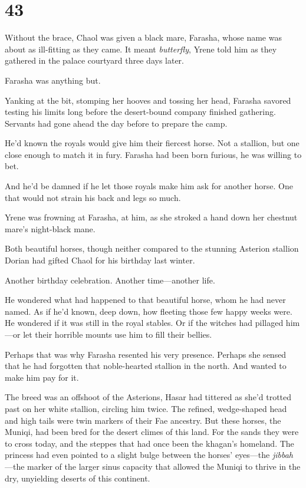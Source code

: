 
\chapter{43}

Without the brace, Chaol was given a black mare, Farasha, whose name was about as ill-fitting as they came.
It meant \emph{butterfly}, Yrene told him as they gathered in the palace courtyard three days later.

Farasha was anything but.

Yanking at the bit, stomping her hooves and tossing her head, Farasha savored testing his limits long before the desert-bound company finished gathering.
Servants had gone ahead the day before to prepare the camp.

He'd known the royals would give him their fiercest horse.
Not a stallion, but one close enough to match it in fury.
Farasha had been born furious, he was willing to bet.

And he'd be damned if he let those royals make him ask for another horse.
One that would not strain his back and legs so much.

Yrene was frowning at Farasha, at him, as she stroked a hand down her chestnut mare's night-black mane.

Both beautiful horses, though neither compared to the stunning Asterion stallion Dorian had gifted Chaol for his birthday last winter.

Another birthday celebration.
Another time---another life.

He wondered what had happened to that beautiful horse, whom he had never named.
As if he'd known, deep down, how fleeting those few happy weeks were.
He wondered if it was still in the royal stables.
Or if the witches had pillaged him---or let their horrible mounts use him to fill their bellies.

Perhaps that was why Farasha resented his very presence.
Perhaps she sensed that he had forgotten that noble-hearted stallion in the north.
And wanted to make him pay for it.

The breed was an offshoot of the Asterions, Hasar had tittered as she'd trotted past on her white stallion, circling him twice.
The refined, wedge-shaped head and high tails were twin markers of their Fae ancestry.
But these horses, the Muniqi, had been bred for the desert climes of this land.
For the sands they were to cross today, and the steppes that had once been the khagan's homeland.
The princess had even pointed to a slight bulge between the horses' eyes---the \emph{jibbah}
---the marker of the larger sinus capacity that allowed the Muniqi to thrive in the dry, unyielding deserts of this continent.

